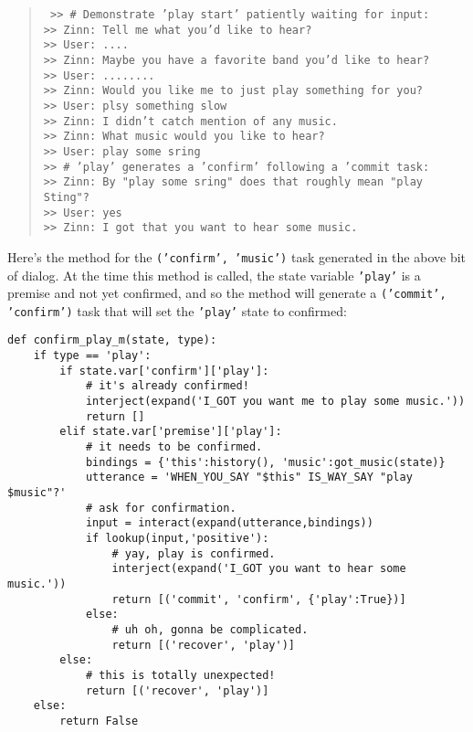 \documentclass[letterpaper,12pt]{article}
\begin{document}
\begin{quotation} \tt
%
  >> # Demonstrate 'play start' patiently waiting for input:\\
  >> Zinn: Tell me what you'd like to hear?\\
  >> User: ....\\
  >> Zinn: Maybe you have a favorite band you'd like to hear?\\
  >> User: ........\\
  >> Zinn: Would you like me to just play something for you?\\
  >> User: plsy something slow\\
  >> Zinn: I didn't catch mention of any music.\\
  >> Zinn: What music would you like to hear?\\
  >> User: play some sring\\
  >> # 'play' generates a 'confirm' following a 'commit task:\\
  >> Zinn: By "play some sring" does that roughly mean "play Sting"?\\
  >> User: yes\\
  >> Zinn: I got that you want to hear some music.\\
%
\end{quotation}

Here's the method for the {\tt{('confirm', 'music')}} task generated in the above bit of dialog. At the time this method is called, the state variable {\tt{'play'}} is a premise and not yet confirmed, and so the method will generate a {\tt{('commit', 'confirm')}} task that will set the {\tt{'play'}} state to confirmed: 
%
\begin{verbatim}
def confirm_play_m(state, type):
    if type == 'play':
        if state.var['confirm']['play']:
            # it's already confirmed!
            interject(expand('I_GOT you want me to play some music.'))
            return []
        elif state.var['premise']['play']:
            # it needs to be confirmed.
            bindings = {'this':history(), 'music':got_music(state)}
            utterance = 'WHEN_YOU_SAY "$this" IS_WAY_SAY "play $music"?'
            # ask for confirmation.
            input = interact(expand(utterance,bindings))
            if lookup(input,'positive'):
                # yay, play is confirmed.
                interject(expand('I_GOT you want to hear some music.'))
                return [('commit', 'confirm', {'play':True})]
            else:
                # uh oh, gonna be complicated.
                return [('recover', 'play')]
        else:
            # this is totally unexpected!
            return [('recover', 'play')]
    else:
        return False
\end{verbatim}
\end{document}
